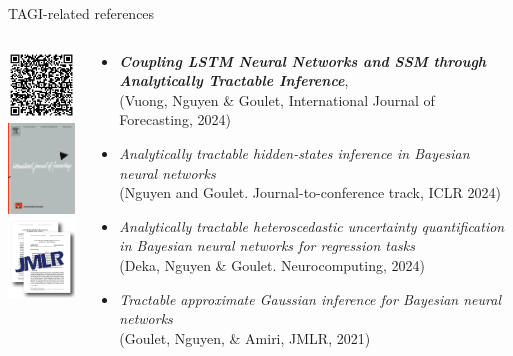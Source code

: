 \documentclass[final]{beamer}
\begin{document}
\begin{frame}[t]
\begin{columns}
\begin{column}[T]{.31\textwidth}
\begin{block}{TAGI-related references}
\begin{columns}
\begin{column}{.15\textwidth}\centering
\includegraphics[width=30mm]{Figures/cuTAGI_refs_QR.pdf}\\[5pt]
\includegraphics[width=20mm]{Figures/IJF.jpg}\\[5pt]
\includegraphics[width=22mm]{Figures/TAGI_AA_JMLR_2.png}
\end{column}\hspace{-20mm}


\begin{column}{.79\textwidth}
\begin{itemize}
\item \emph{\alert{\bf Coupling LSTM Neural Networks and SSM through Analytically Tractable Inference}},\\(Vuong, Nguyen \& Goulet, International Journal of Forecasting, 2024)
\item \emph{Analytically tractable hidden-states inference in Bayesian neural networks}\\ (Nguyen and Goulet. Journal-to-conference track, ICLR 2024)
\item \emph{Analytically tractable heteroscedastic uncertainty quantification in Bayesian neural networks for regression tasks}\\ (Deka, Nguyen \& Goulet. Neurocomputing, 2024)
\item \emph{Tractable approximate Gaussian inference for Bayesian neural networks}\\ (Goulet, Nguyen, \& Amiri, JMLR, 2021)
\end{itemize}
\end{column}
\end{columns}
\end{block}





\end{column}
\end{columns}
\end{frame}
\end{document}
